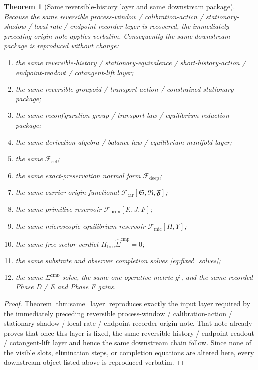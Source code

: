 \documentclass[11pt]{article}
\newcommand{\CompletedMetric}{g^{\sharp}}
\newcommand{\CompLift}{\widehat\Sigma^{\mathrm{cmp}}}
\newcommand{\FreeProj}{\Pi_{\mathrm{free}}}
\newcommand{\GaugeAux}{Y}
\newcommand{\MicFunctional}{\mathscr F_{\mathrm{mic}}}
\newcommand{\PrimFunctional}{\mathscr F_{\mathrm{prim}}}
\newcommand{\CarrierFunctional}{\mathscr F_{\mathrm{car}}}
\newcommand{\DeepFunctional}{\mathscr F_{\mathrm{deep}}}
\newcommand{\StemFunctional}{\mathscr F_{\mathrm{sel}}}
\newcommand{\PrimStrain}{K}
\newcommand{\PrimNeutral}{J}
\newcommand{\PrimFree}{F}
\newcommand{\CarrierSeed}{\mathfrak S}
\newcommand{\RelabelSeed}{\mathfrak R}
\newcommand{\FreeSeed}{\mathfrak F}
\newtheorem{theorem}{Theorem}
\begin{document}
\begin{theorem}[Same reversible-history layer and same downstream package]
\label{thm:same_package}
Because the same reversible process-window / calibration-action / stationary-shadow / local-rate / endpoint-recorder layer is recovered, the immediately preceding origin note applies verbatim. Consequently the same downstream package is reproduced without change:
\begin{enumerate}
    \item the same reversible-history / stationary-equivalence / short-history-action / endpoint-readout / cotangent-lift layer;
    \item the same reversible-groupoid / transport-action / constrained-stationary package;
    \item the same reconfiguration-group / transport-law / equilibrium-reduction package;
    \item the same derivation-algebra / balance-law / equilibrium-manifold layer;
    \item the same \(\StemFunctional\);
    \item the same exact-preservation normal form \(\DeepFunctional\);
    \item the same carrier-origin functional \(\CarrierFunctional[\CarrierSeed,\RelabelSeed,\FreeSeed]\);
    \item the same primitive reservoir \(\PrimFunctional[\PrimStrain,\PrimNeutral,\PrimFree]\);
    \item the same microscopic-equilibrium reservoir \(\MicFunctional[H,\GaugeAux]\);
    \item the same free-sector verdict \(\FreeProj\CompLift=0\);
    \item the same substrate and observer completion solves \eqref{eq:fixed_solves};
    \item the same \(\Sigma^{\mathrm{cmp}}\) solve, the same one operative metric \(\CompletedMetric\), and the same recorded Phase D / E and Phase F gains.
\end{enumerate}
\end{theorem}

\begin{proof}
Theorem \ref{thm:same_layer} reproduces exactly the input layer required by the immediately preceding reversible process-window / calibration-action / stationary-shadow / local-rate / endpoint-recorder origin note. That note already proves that once this layer is fixed, the same reversible-history / endpoint-readout / cotangent-lift layer and hence the same downstream chain follow. Since none of the visible slots, elimination steps, or completion equations are altered here, every downstream object listed above is reproduced verbatim.
\end{proof}
\end{document}
